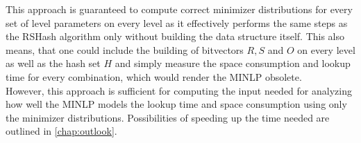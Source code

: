 \documentclass[a4paper,titlepage,onecolumn,oneside,12pt,nenglish,titlepage=firstiscover]{scrbook}
\theoremstyle{plain} %
\theoremstyle{definition} %
\theoremstyle{remark} %
\theoremstyle{plain}
\begin{document}
This approach is guaranteed to compute correct minimizer distributions for every set of level parameters on every level as it effectively performs the same steps as the RSHash algorithm only without building the data structure itself. This also means, that one could include the building of bitvectors $R,S$ and $O$ on every level as well as the hash set $H$ and simply measure the space consumption and lookup time for every combination, which would render the MINLP obsolete.\\
However, this approach is sufficient for computing the input needed for analyzing how well the MINLP models the lookup time and space consumption using only the minimizer distributions. Possibilities of speeding up the time needed are outlined in \cref{chap:outlook}.

\printbibliography[heading=bibintoc,title={Bibliography}]
\end{document}
